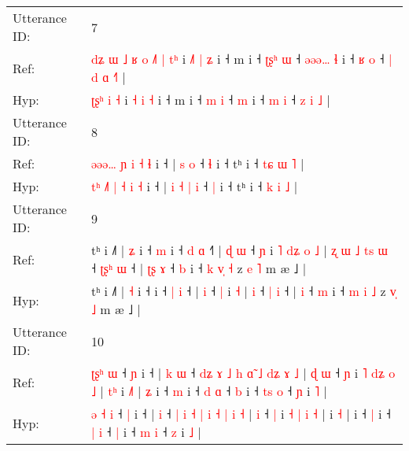 \documentclass[10pt]{article}
\DeclareRobustCommand{\hl}[1]{{\textcolor{red}{#1}}}
\begin{document}
\begin{longtable}{ll}
 \\
\midrule
Utterance ID: & 7 \\
Ref: & \hl{d}\hl{ʑ}\hl{ }\hl{ɯ}\hl{ }\hl{˩}\hl{ }\hl{ʁ}\hl{ }\hl{o}\hl{ }\hl{˩}\hl{˥} \hl{|} \hl{t}\hl{ʰ} i \hl{˩}\hl{˥} \hl{|} \hl{ʑ} i ˧ m i ˧ \hl{ʈ}\hl{ʂ}\hl{ʰ} \hl{ɯ} ˧\hl{ }\hl{ə}\hl{ə}\hl{ə}\hl{…} \hl{ɬ} i ˧ \hl{ʁ} \hl{o} ˧\hl{ }\hl{|} \hl{d} \hl{ɑ} \hl{˧}\hl{˥} |
 \\
Hyp: & \hl{}\hl{}\hl{}\hl{}\hl{}\hl{}\hl{}\hl{}\hl{}\hl{}\hl{ʈ}\hl{ʂ}\hl{ʰ} \hl{i} \hl{}\hl{˧} i \hl{}\hl{˧} \hl{i} \hl{˧} i ˧ m i ˧ \hl{}\hl{}\hl{m} \hl{i} ˧\hl{}\hl{}\hl{}\hl{}\hl{} \hl{m} i ˧ \hl{m} \hl{i} ˧\hl{}\hl{} \hl{z} \hl{i} \hl{}\hl{˩} |
 \\
\midrule
Utterance ID: & 8 \\
Ref: & \hl{}\hl{ə}\hl{ə}\hl{ə}\hl{…} \hl{ɲ} \hl{i} \hl{˧} \hl{ɬ} i ˧ |\hl{}\hl{}\hl{}\hl{} \hl{s} \hl{o} ˧ \hl{ɬ} i ˧ tʰ i ˧ \hl{t}\hl{ɕ} \hl{ɯ} \hl{˥} |
 \\
Hyp: & \hl{t}\hl{ʰ}\hl{ }\hl{˩}\hl{˥} \hl{|} \hl{˧} \hl{i} \hl{˧} i ˧ |\hl{ }\hl{i}\hl{ }\hl{˧} \hl{|} \hl{i} ˧ \hl{|} i ˧ tʰ i ˧ \hl{}\hl{k} \hl{i} \hl{˩} |
 \\
\midrule
Utterance ID: & 9 \\
Ref: & tʰ i ˩˥ | \hl{ʑ} i ˧\hl{ }\hl{m} i ˧ \hl{d} \hl{ɑ} ˧\hl{˥} |\hl{ }\hl{ɖ} \hl{ɯ} ˧ \hl{ɲ} i\hl{ }\hl{˥}\hl{ }\hl{d}\hl{ʑ}\hl{ }\hl{o} \hl{˩} |\hl{ }\hl{ʐ}\hl{ }\hl{ɯ}\hl{ }\hl{˩}\hl{ }\hl{t}\hl{s} \hl{ɯ} ˧ \hl{ʈ}\hl{ʂ}\hl{ʰ} \hl{ɯ} ˧ |\hl{ }\hl{ʈ}\hl{ʂ} \hl{ɤ} ˧ \hl{b} i ˧ \hl{k} \hl{v}\hl{̩} \hl{˧} z \hl{}\hl{e} \hl{˥} m æ ˩ |
 \\
Hyp: & tʰ i ˩˥ | \hl{˧} i ˧\hl{}\hl{} i ˧ \hl{|} \hl{i} ˧\hl{} |\hl{}\hl{} \hl{i} ˧ \hl{|} i\hl{}\hl{}\hl{}\hl{}\hl{}\hl{}\hl{} \hl{˧} |\hl{}\hl{}\hl{}\hl{}\hl{}\hl{}\hl{}\hl{}\hl{} \hl{i} ˧ \hl{}\hl{}\hl{|} \hl{i} ˧ |\hl{}\hl{}\hl{} \hl{i} ˧ \hl{m} i ˧ \hl{m} \hl{}\hl{i} \hl{˩} z \hl{v}\hl{̩} \hl{˩} m æ ˩ |
 \\
\midrule
Utterance ID: & 10 \\
Ref: & \hl{ʈ}\hl{ʂ}\hl{ʰ} \hl{ɯ} ˧ \hl{ɲ} i ˧ |\hl{ }\hl{k} \hl{ɯ} ˧ \hl{d}\hl{ʑ} \hl{ɤ} \hl{˩} \hl{h} \hl{ɑ}\hl{̃} \hl{˩} \hl{d}\hl{ʑ} \hl{ɤ} \hl{˩} |\hl{ }\hl{ɖ} \hl{ɯ} ˧ \hl{ɲ} i \hl{˥} \hl{d}\hl{ʑ} \hl{o} \hl{˩} |\hl{ }\hl{t}\hl{ʰ} i \hl{˩}\hl{˥} |\hl{ }\hl{ʑ} i ˧ \hl{m} i ˧ \hl{d} \hl{ɑ} ˧ \hl{b} i ˧ \hl{t}\hl{s} \hl{o} ˧ \hl{ɲ} i \hl{˥} |
 \\
Hyp: & \hl{ə}\hl{ }\hl{˧} \hl{i} ˧ \hl{|} i ˧ |\hl{}\hl{} \hl{i} ˧ \hl{}\hl{|} \hl{i} \hl{˧} \hl{|} \hl{}\hl{i} \hl{˧} \hl{}\hl{|} \hl{i} \hl{˧} |\hl{}\hl{} \hl{i} ˧ \hl{|} i \hl{˧} \hl{}\hl{|} \hl{i} \hl{˧} |\hl{}\hl{}\hl{} i \hl{}\hl{˧} |\hl{}\hl{} i ˧ \hl{|} i ˧ \hl{|} \hl{i} ˧ \hl{|} i ˧ \hl{}\hl{m} \hl{i} ˧ \hl{z} i \hl{˩} |

\end{longtable}
\end{document}

